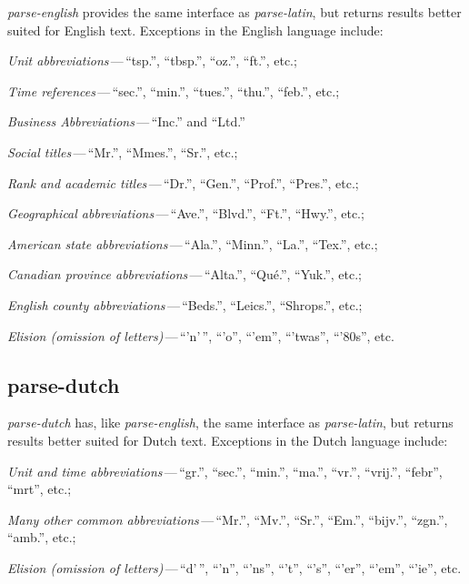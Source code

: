 \emph{parse-english} provides the same interface as \emph{parse-latin}, but
returns results better suited for English text.
Exceptions in the English language include:

\begin{aenumerate}
\item \emph{Unit abbreviations}\,---\,``tsp.'', ``tbsp.'', ``oz.'', ``ft.'',
  etc.;
\item\emph{Time references}\,---\,``sec.'', ``min.'', ``tues.'', ``thu.'',
  ``feb.'', etc.;
\item\emph{Business Abbreviations}\,---\,``Inc.'' and ``Ltd.''
\item\emph{Social titles}\,---\,``Mr.'', ``Mmes.'', ``Sr.'', etc.;
\item\emph{Rank and academic titles}\,---\,``Dr.'', ``Gen.'', ``Prof.'',
  ``Pres.'', etc.;
\item\emph{Geographical abbreviations}\,---\,``Ave.'', ``Blvd.'', ``Ft.'',
  ``Hwy.'', etc.;
\item\emph{American state abbreviations}\,---\,``Ala.'', ``Minn.'', ``La.'',
  ``Tex.'', etc.;
\item\emph{Canadian province abbreviations}\,---\,``Alta.'', ``Qué.'',
  ``Yuk.'', etc.;
\item\emph{English county abbreviations}\,---\,``Beds.'', ``Leics.'',
  ``Shrops.'', etc.;
\item\emph{Elision (omission of letters)}\,---\,``'n'\,'', ``'o'', ``'em'',
  ``'twas'', ``'80s'', etc.
\end{aenumerate}

\subsection{parse-dutch}\label{parse-dutch}

\emph{parse-dutch} has, like \emph{parse-english}, the same interface as
\emph{parse-latin}, but returns results better suited for Dutch text.
Exceptions in the Dutch language include:

\begin{aenumerate}
\item\emph{Unit and time abbreviations}\,---\,``gr.'', ``sec.'', ``min.'', ``ma.'',
  ``vr.'', ``vrij.'', ``febr'', ``mrt'', etc.;
\item\emph{Many other common abbreviations}\,---\,``Mr.'', ``Mv.'', ``Sr.'',
  ``Em.'', ``bijv.'', ``zgn.'', ``amb.'', etc.;
\item\emph{Elision (omission of letters)}\,---\,``d'\,'', ``'n'', ``'ns'',
  ``'t'', ``'s'', ``'er'', ``'em'', ``'ie'', etc.
\end{aenumerate}

